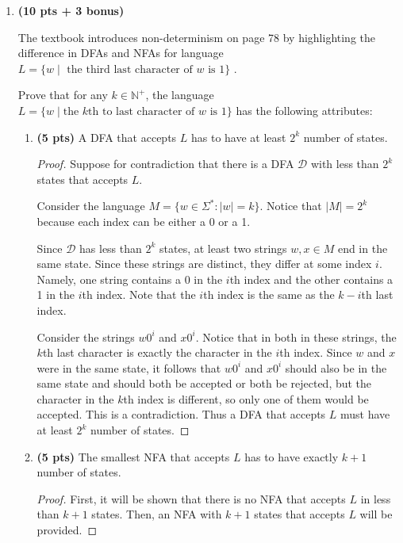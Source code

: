 \documentclass[11pt]{article}
\begin{document}
\begin{enumerate}[label=\textbf{Q\arabic*.}]
\begin{enumerate}[label=\textit{\alph*)}]
\begin{proof}
	\end{proof}

\end{enumerate}


(Continued on the next page)

\newpage

\item \textbf{(10 pts + 3 bonus)}

The textbook introduces non-determinism on page 78 by highlighting the difference in DFAs and NFAs for language $L = \{w \mid \text{ the third last character of } w \text{ is } 1\}$ . 

Prove that for any $k\in \mathbb{N}^+$, the language $L = \{ w \mid \text{the } k\text{th to last character of } w \text{ is } 1\}$ has the following attributes:


\begin{enumerate}[label=\textit{\alph*)}]
\item \textbf{(5 pts)} A DFA that accepts $L$ has to have at least $2^k$ number of states.
\begin{proof}
	Suppose for contradiction that there is a DFA \(\mathcal{D}\) with less than \(2^k\) states that accepts \(L\).

	Consider the language \(M = \{w \in \Sigma ^* : |w| = k\}\). Notice that \(|M| = 2^k\) because each index can be either a 0 or a 1.

	Since \(\mathcal{D}\) has less than \(2^k\) states, at least two strings \(w,x \in M\) end in the same state. Since these strings are distinct, they differ at some index \(i\). Namely, one string contains a 0 in the \(i\)th index and the other contains a 1 in the \(i\)th index. Note that the \(i\)th index is the same as the \(k-i\)th last index.

	Consider the strings \(w0^i\) and \(x0^i\). Notice that in both in these strings, the \(k\)th last character is exactly the character in the \(i\)th index. Since \(w\) and \(x\) were in the same state, it follows that \(w0^i\) and \(x0^i\) should also be in the same state and should both be accepted or both be rejected, but the character in the \(k\)th index is different, so only one of them would be accepted. This is a contradiction. Thus a DFA that accepts \(L\) must have at least \(2^k\) number of states.
	\smallbreak
\end{proof}

\item \textbf{(5 pts)} The smallest NFA that accepts $L$ has to have exactly $k + 1$ number of states.
\begin{proof}
	First, it will be shown that there is no NFA that accepts \(L\) in less than \(k+1\) states. Then, an NFA with \(k+1\) states that accepts \(L\) will be provided.
	

\end{proof}
\end{enumerate}
\end{enumerate}
\end{document}
